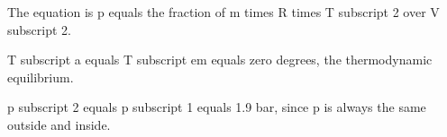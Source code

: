 The equation is p equals the fraction of m times R times T subscript 2 over V subscript 2.

T subscript a equals T subscript em equals zero degrees, the thermodynamic equilibrium.

p subscript 2 equals p subscript 1 equals 1.9 bar, since p is always the same outside and inside.